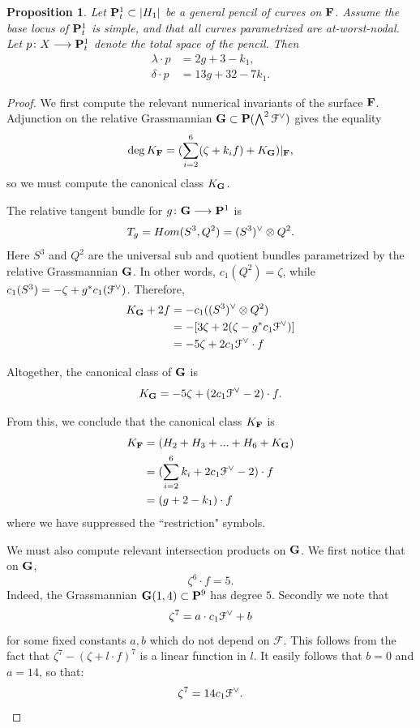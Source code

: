 \documentclass[reqno, 10 pt]{article}
\newtheorem{prop}[thm]{Proposition}
\theoremstyle{definition}
\theoremstyle{remark}
\numberwithin{equation}{section}
\numberwithin{thm}{section}
\numberwithin{prop}{section}
\numberwithin{lem}{section}
\numberwithin{cor}{section}
\numberwithin{conj}{section}
\numberwithin{defn}{section}
\newcommand{\F}{{\mathbf F}}
\renewcommand{\to}{\longrightarrow}
\newcommand{\cF}{{\mathcal F}}
\newcommand{\bG}{{\bf G}}
\renewcommand{\P}{{\bf P}}
\renewcommand{\F}{{\bf F}}
\newcommand {\from}{{\colon}}
\begin{document}
\begin{prop}\label{pentnum}
Let $\P^{1}_{t} \subset |H_{1}|$ be a general pencil of curves on $\F$.  Assume the base locus of $\P^{1}_{t}$ is simple, and that all curves parametrized are at-worst-nodal.  Let $p \from X \to \P^{1}_{t}$ denote the total space of the pencil. 
Then
\begin{align*}
\lambda \cdot {p} & = 2g+3-k_{1},\\
\delta \cdot p & =  13g + 32 - 7k_{1}.
\end{align*}
\end{prop}
\begin{proof}
We first compute the relevant numerical invariants of the surface $\F$.  Adjunction on the relative Grassmannian $\bG \subset \P (\bigwedge^{2} \dual{\cF})$ gives the equality \[\deg K_{\F} = (\sum_{i=2}^{6}(\zeta + k_{i}f) + K_{\bG})|_{\F},\]
so we must compute the canonical class $K_{\bG}$. 

The relative tangent bundle for $g \colon \bG \longrightarrow {\bf P}^1$ is \[T_g = Hom(S^3,Q^2) = (S^3)^{\vee} \otimes Q^2.\] Here $S^{3}$ and $Q^{2}$ are the universal sub and quotient bundles parametrized by the relative Grassmannian $\bG$. In other words, $c_{1}(Q^{2}) = \zeta$, while $c_{1}(S^{3}) = -\zeta + g^{*}c_{1}(\dual{\cF})$. Therefore, 
\begin{align*}
K_{\bG} + 2f &= -c_1 ((S^3)^ {\vee} \otimes Q^2)\\
& = - [3\zeta + 2(\zeta - g^{*}c_{1}\dual{\cF})]\\
 & = -5\zeta + 2 c_{1}\dual{\cF} \cdot f\\
\end{align*}

Altogether, the canonical class of $\bG$ is 
\begin{equation}\label{KG}
 K_{\bG} = -5\zeta + (2 c_{1}\dual{\cF} - 2)\cdot f.
\end{equation}

From this, we conclude that the canonical class $K_{\F}$ is 
\begin{align*}
K_{\F} &= (H_{2} + H_{3}+...+H_{6} + K_{\bG}) \\
&= (\sum_{i=2}^{6}k_{i} + 2 c_{1}\dual{\cF} - 2)\cdot f\\
&= (g+2-k_{1})\cdot f
\end{align*}
where we have suppressed the ``restriction" symbols.



We must also compute relevant intersection products on $\bG$.  We first notice that on $\bG$,  \[\zeta^6\cdot f = 5.\] Indeed, the Grassmannian $\bG(1,4) \subset \P^{9}$ has degree $5$. Secondly we note that \[\zeta^7 = a\cdot c_{1}\dual{\cF} + b\] for some fixed constants $a,b$ which do not depend on $\mathcal{F}$. This follows from the fact that $\zeta^7 - (\zeta + l\cdot f)^7$ is a linear function in $l$.  It easily follows that $b=0$ and $a=14$, so that: 
\[\zeta^7 = 14c_{1}\dual{\cF}.\]






\end{proof}
\end{document}
